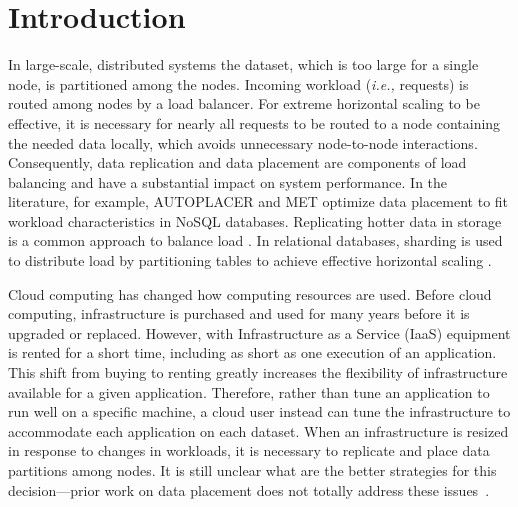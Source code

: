 
\section{Introduction}
\label{sec:introduction}

In large-scale, distributed systems the dataset, which is too large
for a single node, is partitioned among the nodes.
Incoming workload (\emph{i.e.,} requests) is routed among nodes by a
load balancer.
For extreme horizontal scaling to be effective, it is necessary for
nearly all requests to be routed to a node containing the needed data
locally, which avoids unnecessary node-to-node interactions.
Consequently, data replication and data placement are components of load
balancing and have a substantial impact on system performance.
In the literature, for example,
AUTOPLACER \cite{Rodrigues2013} and MET \cite{Cruz2013}
optimize data placement to fit workload characteristics in NoSQL databases.
Replicating hotter data in storage is a common approach
to balance load \cite{Lim2010}.
In relational databases, sharding is used to distribute load
by partitioning tables to achieve effective horizontal scaling
\cite{Chang2008, george2011hbase, Lakshman2010, Adya2016, Curino2010}.


Cloud computing has changed how computing resources are used.
Before cloud computing, infrastructure is purchased and used for many
years before it is upgraded or replaced.
However, with Infrastructure as a Service (IaaS) equipment is rented
for a short time, including as short as one execution of an
application.
This shift from buying to renting greatly increases the flexibility of
infrastructure available for a given application.
Therefore, rather than tune an application to run well on a specific
machine, a cloud user instead can tune the
infrastructure to accommodate each application on each
dataset.
When an infrastructure is resized in response to changes in workloads,
it is necessary to replicate and place data partitions among nodes.
It is still unclear what are the better strategies
for this decision---prior work on data placement
does not totally address these issues~\cite{Rodrigues2013, Cruz2013, Lim2010}.


